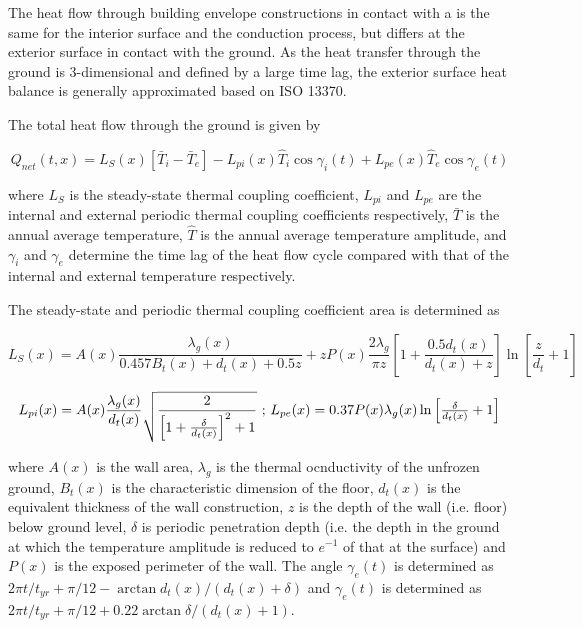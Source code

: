 The heat flow through building envelope constructions in contact with a  is the same for the interior surface and the  conduction process, but differs at the exterior surface in contact with the ground. As the heat transfer through the ground is 3-dimensional and defined by a large time lag, the exterior surface heat balance is generally approximated based on ISO 13370.

The total heat flow through the ground is given by

\begin{dmath}
Q_{net}(t,x) = L_{S}(x) \left[ \bar{T}_{i} - \bar{T}_{e} \right] - L_{pi}(x) \hat{T}_{i} \cos \gamma_{i}(t) + L_{pe}(x) \hat{T}_{e} \cos \gamma_{e}(t)
\end{dmath}

where $L_{S}$ is the steady-state thermal coupling coefficient, $L_{pi}$ and $L_{pe}$ are the internal and external periodic thermal coupling coefficients respectively, $\bar{T}$ is the annual average temperature, $\hat{T}$ is the annual average temperature amplitude, and $\gamma_{i}$ and $\gamma_{e}$ determine the time lag of the heat flow cycle compared with that of the internal and external temperature respectively.

The steady-state and periodic thermal coupling coefficient area is determined as 

\begin{dmath}
L_{S}(x) = A(x) \frac{\lambda_{g}(x)}{0.457 B_{t}(x) + d_{t}(x) + 0.5 z} + z P(x) \frac{2 \lambda_{g}}{\pi z} \left[1+\frac{0.5 d_{t}(x)}{d_{t}(x)+z}\right] \ln \left[\frac{z}{d_{t}}+1\right] 
\end{dmath}

\begin{dmath}
L_{pi}(x) = A(x) \frac{\lambda_{g}(x)}{d_{t}(x)} \sqrt{\frac{2}{\left[ 1 + \frac{\delta}{d_{t}(x)}\right]^{2} +1}} $ ; $ L_{pe}(x) = 0.37 P(x) \lambda_{g}(x) \ln{\left[\frac{\delta}{d_{t}(x)} + 1\right]}
\end{dmath}

where $A(x)$ is the wall area, $\lambda_{g}$ is the thermal ocnductivity of the unfrozen ground, $B_{t}(x)$ is the characteristic dimension of the floor, $d_{t}(x)$ is the equivalent thickness of the wall construction, $z$ is the depth of the wall (i.e. floor) below ground level, $\delta$ is periodic penetration depth (i.e. the depth in the ground at which the temperature amplitude is reduced to $e^{-1}$ of that at the surface) and $P(x)$ is the exposed perimeter of the wall. The angle $\gamma_{e}(t)$ is determined as $2 \pi t / t_{yr} + \pi / 12 - \arctan{d_{t}(x) / \left( d_{t}(x) + \delta \right)}$ and $\gamma_{e}(t)$ is determined as $2 \pi t / t_{yr} + \pi / 12 + 0.22 \arctan{\delta / \left( d_{t}(x) + 1 \right)}$.

